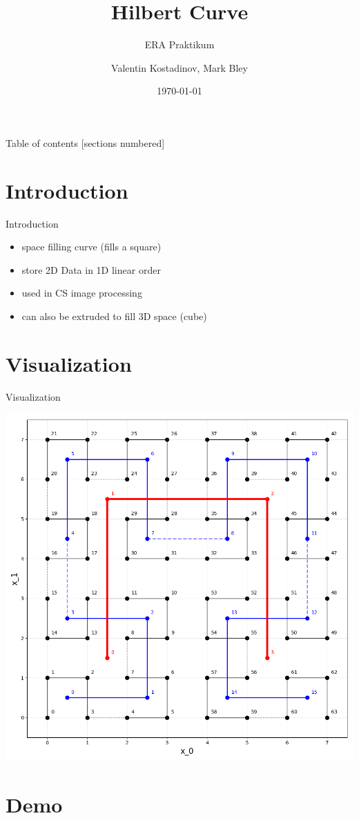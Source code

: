 \documentclass[12pt]{beamer}
\title{Hilbert Curve}
\subtitle{ERA Praktikum}
\date{\today}
\author{Valentin Kostadinov, Mark Bley}
\institute{Technical University of Munich}
\begin{document}
\maketitle

\begin{frame}{Table of contents}
  [sections numbered]
  \tableofcontents[hideallsubsections]
\end{frame}

\section{Introduction}

\begin{frame}[fragile]{Introduction}
    \begin{itemize}
        \item space filling curve (fills a square)
        \item store 2D Data in 1D linear order
        \item used in CS image processing
        \item can also be extruded to fill 3D space (cube)
    \end{itemize}
\end{frame}

\section{Visualization}


\begin{frame}[fragile]{Visualization}
    \begin{center}
        \includegraphics[width=\textwidth,height=0.8\textheight,keepaspectratio]
        {../img/hilbert-sample.png}
    \end{center}
\end{frame}



\section{Demo}
\end{document}

